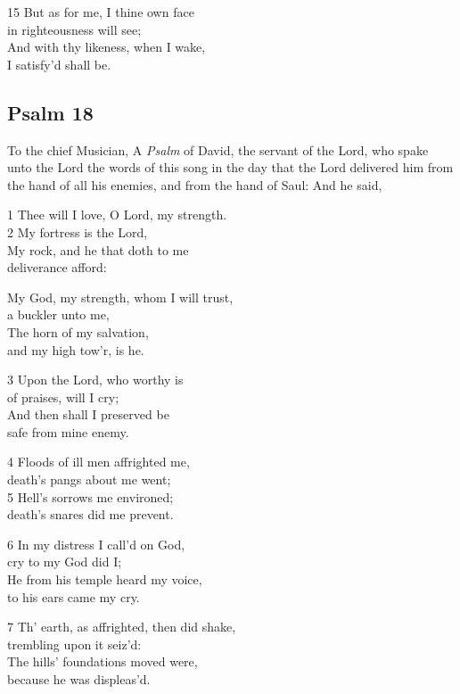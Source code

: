 \begin{multicols}{3}
15 But as for me, I thine own face\\
in righteousness will see;\\
And with thy likeness, when I wake,\\
I satisfy’d shall be.

\begin{center}
\quad{}\quad{}
\end{center}

\subsection*{Psalm 18 }


To the chief Musician, A \emph{Psalm} of David, the servant of the Lord, who spake unto the Lord the words of this song in the day that the Lord delivered him from the hand of all his enemies, and from the hand of Saul: And he said,

1 Thee will I love, O Lord, my strength.\\
2 My fortress is the Lord,\\
My rock, and he that doth to me\\
deliverance afford:

My God, my strength, whom I will trust,\\
a buckler unto me,\\
The horn of my salvation,\\
and my high tow’r, is he.

3 Upon the Lord, who worthy is\\
of praises, will I cry;\\
And then shall I preserved be\\
safe from mine enemy.

4 Floods of ill men affrighted me,\\
death’s pangs about me went;\\
5 Hell’s sorrows me environed;\\
death’s snares did me prevent.

6 In my distress I call’d on God,\\
cry to my God did I;\\
He from his temple heard my voice,\\
to his ears came my cry.

7 Th’ earth, as affrighted, then did shake,\\
trembling upon it seiz’d:\\
The hills’ foundations moved were,\\
because he was displeas’d.


\end{multicols}
